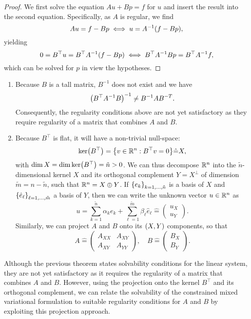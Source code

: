 \begin{proof}
	We first solve the equation \(Au + Bp = f\) for \(u\) and insert the result into the second equation.
	Specifically, as \(A\) is regular, we find
	\[
		Au = f - Bp \iff u = A^{-1}\parentheses*{f - Bp},
	\]
	yielding
	\[
		0 = B^\top u = B^\top A^{-1}\parentheses*{f - Bp} \iff B^\top A^{-1}Bp = B^\top A^{-1}f,
	\]
	which can be solved for \(p\) in view the hypotheses.
\end{proof}

\begin{remark}
	\begin{enumerate}
		\item Because \(B\) is a tall matrix, \(B^{-1}\) does not exist and we have
		\[
			\parentheses*{B^\top A^{-1}B}^{-1} \ne B^{-1}AB^{-T}.
		\]
		Consequently, the regularity conditions above are not yet satisfactory as they require regularity of a matrix that combines \(A\) and \(B\).
		\item Because \(B^\top\) is flat, it will have a non-trivial null-space:
		\[
			\ker\parentheses*{B^\top} = \braces*{v \in \R^n : B^\top v = 0} \hat{=} X,
		\]
		with \(\dim X = \dim\ker\parentheses*{B^\top} = \tilde{n} > 0\).
		We can thus decompose \(\R^n\) into the \(\tilde{n}\)-dimensional kernel \(X\) and its orthogonal complement \(Y = X^\bot\) of dimension \(\tilde{m} = n - \tilde{n}\), such that \(\R^n = X \oplus Y\). If \(\braces*{e_k}_{k = 1, \ldots, \tilde{n}}\) is a basis of \(X\) and \(\braces*{\hat{e}_\ell}_{\ell = 1, \ldots, \tilde{m}}\) a basis of \(Y\), then we can write the unknown vector \(u \in \R^n\) as
		\[
			u = \sum_{k = 1}^{\tilde{n}}\alpha_k e_k + \sum_{\ell = 1}^{\tilde{m}}\beta_\ell \hat{e}_\ell \hat{=} \begin{pmatrix}
				u_X\\
				u_Y
			\end{pmatrix}.
		\]
		Similarly, we can project \(A\) and \(B\) onto its \(\parentheses*{X, Y}\) components, so that
		\[
			A \hat{=} \begin{pmatrix}
				A_{XX} & A_{XY}\\
				A_{XY} & A_{YY}
			\end{pmatrix}, \quad B \hat{=} \begin{pmatrix}
				B_X\\
				B_Y
			\end{pmatrix}.
		\]
	\end{enumerate}
\end{remark}

Although the previous theorem states solvability conditions for the linear system, they are not yet satisfactory as it requires the regularity of a matrix that combines \(A\) and \(B\).
However, using the projection onto the kernel \(B^\top\) and its orthogonal complement, we can relate the solvability of the constrained mixed variational formulation to suitable regularity conditions for \(A\) and \(B\) by exploiting this projection approach.

